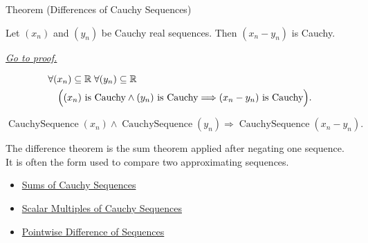 \begin{theorembox}{Theorem (Differences of Cauchy Sequences)}
\begin{theorem}
\label{thm:difference-cauchy-sequences}
Let $(x_n)$ and $(y_n)$ be Cauchy real sequences. Then $(x_n-y_n)$ is
Cauchy.

\smallskip
\noindent
\hyperref[prf:difference-cauchy-sequences]{\textit{Go to proof.}}
\end{theorem}
\end{theorembox}

\begin{remark*}
\[
\begin{aligned}
&\forall (x_n)\subseteq\mathbb{R}\;\forall (y_n)\subseteq\mathbb{R}\\
&\quad
\Bigl(
  (x_n)\text{ is Cauchy}
  \land
  (y_n)\text{ is Cauchy}
  \Longrightarrow
  (x_n-y_n)\text{ is Cauchy}
\Bigr).
\end{aligned}
\]
\end{remark*}

\begin{remark*}
\[
\operatorname{CauchySequence}(x_n)
\land
\operatorname{CauchySequence}(y_n)
\Longrightarrow
\operatorname{CauchySequence}(x_n-y_n).
\]
\end{remark*}

\begin{remark*}[Interpretation]
The difference theorem is the sum theorem applied after negating one
sequence. It is often the form used to compare two approximating sequences.
\end{remark*}

\begin{dependencies}
\begin{itemize}
  \item \hyperref[thm:sum-cauchy-sequences]{Sums of Cauchy Sequences}
  \item \hyperref[thm:scalar-multiple-cauchy-sequence]{Scalar Multiples of Cauchy Sequences}
  \item \hyperref[def:pointwise-difference-sequence]{Pointwise Difference of Sequences}
\end{itemize}
\end{dependencies}


